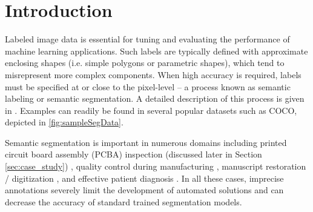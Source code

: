 \section{Introduction}
Labeled image data is essential for tuning and evaluating the performance of machine learning applications.
Such labels are typically defined with approximate enclosing shapes (i.e. simple polygons or parametric shapes), which tend to misrepresent more complex components.
When high accuracy is required, labels must be specified at or close to the pixel-level – a process known as semantic labeling or semantic segmentation.
A detailed description of this process is given in \cite{chengSurveyAnalysisAutomatic2018}. Examples can readily be found in several popular datasets such as COCO, depicted in \autoref{fig:sampleSegData}.

\makeSampleSegFig


Semantic segmentation is important in numerous domains including printed circuit board assembly (PCBA) inspection (discussed later in Section \ref{sec:case_study}) \cite{paradis2020color,azhaganReviewAutomaticBill2019}, quality control during manufacturing \cite{fergusonDetectionSegmentationManufacturing2018,anagnostopoulosComputerVisionApproach2001,anagnostopoulosHighPerformanceComputing2002}, manuscript restoration / digitization \cite{gatosSegmentationfreeRecognitionTechnique2004,kesimanNewSchemeText2016,jainTextSegmentationUsing1992,taxtSegmentationDocumentImages1989,fujisawaSegmentationMethodsCharacter1992}, and effective patient diagnosis \cite{seifertSemanticAnnotationMedical2010,rajchlDeepCutObjectSegmentation2017,yushkevichUserguided3DActive2006,iakovidisRatsnakeVersatileImage2014}.
In all these cases, imprecise annotations severely limit the development of automated solutions and can decrease the accuracy of standard trained segmentation models.

